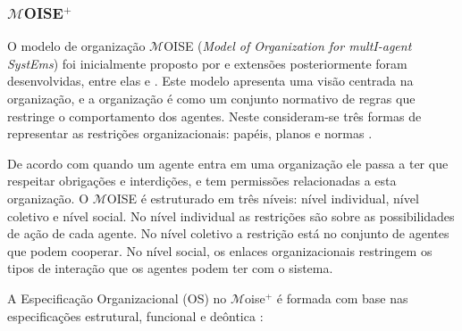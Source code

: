 \subsubsection{$\mathcal{M}$OISE$^{+}$}

O modelo de organização $\mathcal{M}$OISE (\textit{Model of Organization for multI-agent SystEms}) foi inicialmente proposto por \cite{hannoun2000moise} e extensões posteriormente foram desenvolvidas, entre elas \cite{hubner2003modelo} e \cite{hubner2005mathcal}. Este modelo apresenta uma visão centrada na organização, e a organização é como um conjunto normativo de regras que restringe o comportamento dos agentes. Neste consideram-se três formas de representar as restrições organizacionais: papéis, planos e normas \cite{hannoun2000moise}.

De acordo com \cite{hannoun2000moise} quando um agente entra em uma organização ele passa a ter que respeitar obrigações e interdições, e tem permissões relacionadas a esta organização. O $\mathcal{M}$OISE é estruturado em três níveis: nível individual, nível coletivo e nível social. No nível individual as restrições são sobre as possibilidades de ação de cada agente. No nível coletivo a restrição está no conjunto de agentes que podem cooperar. No nível social, os enlaces organizacionais restringem os tipos de interação que os agentes podem ter com o sistema.

A Especificação Organizacional (OS) no $\mathcal{M}$oise$^{+}$ é formada com base nas especificações estrutural, funcional e deôntica \cite{hubner2003modelo}:

